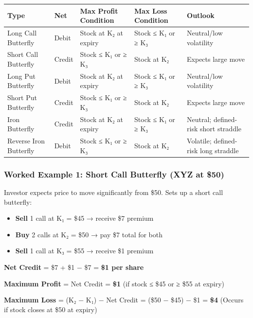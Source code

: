 \documentclass[12pt,openany]{book}
\begin{document}
\begin{center}
\scriptsize
\setlength{\tabcolsep}{3pt}
\begin{tabular}{|L{2.65cm}|L{2.65cm}|L{2.65cm}|L{2.65cm}|L{2.65cm}|}
\hline
Type & Net & Max Profit Condition & Max Loss Condition & Outlook \\
\hline
Long Call Butterfly & Debit & Stock at K₂ at expiry & Stock ≤ K₁ or ≥ K₃ & Neutral/low volatility \\
\hline
Short Call Butterfly & Credit & Stock ≤ K₁ or ≥ K₃ & Stock at K₂ & Expects large move \\
\hline
Long Put Butterfly & Debit & Stock at K₂ at expiry & Stock ≤ K₁ or ≥ K₃ & Neutral/low volatility \\
\hline
Short Put Butterfly & Credit & Stock ≤ K₁ or ≥ K₃ & Stock at K₂ & Expects large move \\
\hline
Iron Butterfly & Credit & Stock at K₂ at expiry & Stock ≤ K₁ or ≥ K₃ & Neutral; defined-risk short straddle \\
\hline
Reverse Iron Butterfly & Debit & Stock ≤ K₁ or ≥ K₃ & Stock at K₂ & Volatile; defined-risk long straddle \\
\hline
\end{tabular}
\end{center}



\subsubsection{Worked Example 1: Short Call Butterfly (XYZ at \$50)}

Investor expects price to move significantly from \$50. Sets up a short call butterfly:
\begin{itemize}[leftmargin=*]
    \item \textbf{Sell} 1 call at K₁ = \$45 → receive \$7 premium
    \item \textbf{Buy} 2 calls at K₂ = \$50 → pay \$7 total for both
    \item \textbf{Sell} 1 call at K₃ = \$55 → receive \$1 premium
\end{itemize}

\textbf{Net Credit} = \$7 + \$1 − \$7 = \textbf{\$1 per share}

\textbf{Maximum Profit} = Net Credit = \textbf{\$1} (if stock ≤ \$45 or ≥ \$55 at expiry)

\textbf{Maximum Loss} = (K₂ − K₁) − Net Credit = (\$50 − \$45) − \$1 = \textbf{\$4}
(Occurs if stock closes at \$50 at expiry)
\end{document}
